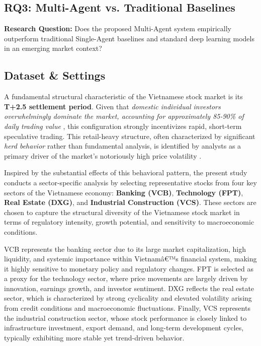 \documentclass{ieeeaccess}
\begin{document}
\subsection{RQ3: Multi-Agent vs. Traditional Baselines}

\textbf{Research Question:} Does the proposed Multi-Agent system empirically outperform traditional Single-Agent baselines and standard deep learning models in an emerging market context?



\subsection{Dataset \& Settings}
A fundamental structural characteristic of the Vietnamese stock market is its \textbf{T+2.5 settlement period}. Given that \textit{domestic individual investors overwhelmingly dominate the market, accounting for approximately 85-90\% of daily trading value} \cite{TinNhanhChungkhoan2025}, this configuration strongly incentivizes rapid, short-term speculative trading. This retail-heavy structure, often characterized by significant \textit{herd behavior} rather than fundamental analysis, is identified by analysts as a primary driver of the market's notoriously high price volatility \cite{WorldBank2024, Yuanta2025}.



Inspired by the substantial effects of this behavioral pattern, the present study conducts a sector-specific analysis by selecting representative stocks from four key sectors of the Vietnamese economy: \textbf{Banking (VCB)}, \textbf{Technology (FPT)}, \textbf{Real Estate (DXG)}, and \textbf{Industrial Construction (VCS)}. These sectors are chosen to capture the structural diversity of the Vietnamese stock market in terms of regulatory intensity, growth potential, and sensitivity to macroeconomic conditions.

VCB represents the banking sector due to its large market capitalization, high liquidity, and systemic importance within Vietnamâ€™s financial system, making it highly sensitive to monetary policy and regulatory changes. FPT is selected as a proxy for the technology sector, where price movements are largely driven by innovation, earnings growth, and investor sentiment. DXG reflects the real estate sector, which is characterized by strong cyclicality and elevated volatility arising from credit conditions and macroeconomic fluctuations. Finally, VCS represents the industrial construction sector, whose stock performance is closely linked to infrastructure investment, export demand, and long-term development cycles, typically exhibiting more stable yet trend-driven behavior.
\end{document}
